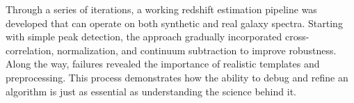 \documentclass[12pt]{article}
\begin{document}
Through a series of iterations, a working redshift estimation pipeline was developed that can operate on both synthetic and real galaxy spectra. Starting with simple peak detection, the approach gradually incorporated cross-correlation, normalization, and continuum subtraction to improve robustness. Along the way, failures revealed the importance of realistic templates and preprocessing. This process demonstrates how the ability to debug and refine an algorithm is just as essential as understanding the science behind it.



\end{document}
